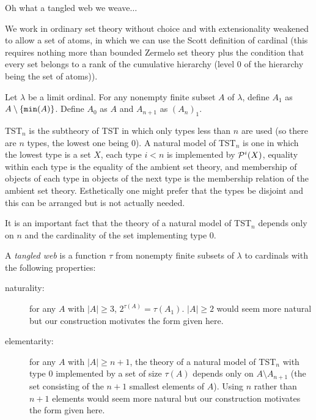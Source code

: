 \documentclass{slides}
\begin{document}
\begin{slide}

{\Large Oh what a tangled web we weave$\ldots$}

We work in ordinary set theory without choice and with extensionality weakened to allow a set of atoms, in which we can use the Scott definition of cardinal (this requires nothing more than bounded Zermelo set theory plus
the condition that every set belongs to a rank of the cumulative hierarchy (level 0 of the hierarchy being the set of atoms)).

Let $\lambda$ be a limit ordinal.  For any nonempty finite subset $A$ of $\lambda$, define $A_1$ as $A \setminus \{{\tt min}(A)\}$.   Define $A_0$ as $A$
and $A_{n+1}$ as $(A_n)_1$.

\end{slide}

\begin{slide}

TST$_n$ is the subtheory of TST in which only types less than $n$ are used (so there are $n$ types, the lowest one being 0).  A natural model of TST$_n$ is one in which
the lowest type is a set $X$, each type $i<n$ is implemented by ${\cal P}^i(X)$, equality within each type is the equality of the ambient set theory, and membership of objects
of each type in objects of the next type is the membership relation of the ambient set theory.  Esthetically one might prefer that the types be disjoint and this can be arranged but is not actually needed.

It is an important fact that the theory of a natural model of TST$_n$ depends only on $n$ and the cardinality of the set implementing type 0.

\end{slide}

\begin{slide}

A {\em tangled web\/} is a function $\tau$ from nonempty finite subsets of $\lambda$ to cardinals with the following properties:

\begin{description}

\item[naturality:]  for any $A$ with $|A|\geq 3$, $2^{\tau(A)} = \tau(A_1)$.  $|A|\geq 2$ would seem more natural but our construction motivates the form given here.

\item[elementarity:]   for any $A$ with $|A|\geq  n+1$, the theory of a natural model of TST$_n$ with type 0 implemented by a set of size $\tau(A)$ depends only on  $A \setminus A_{n+1}$ (the set
consisting of the $n+1$ smallest elements of $A$).  Using $n$ rather than $n+1$ elements would seem more natural but our construction motivates the form given here.

\end{description}


\end{slide}
\end{document}
